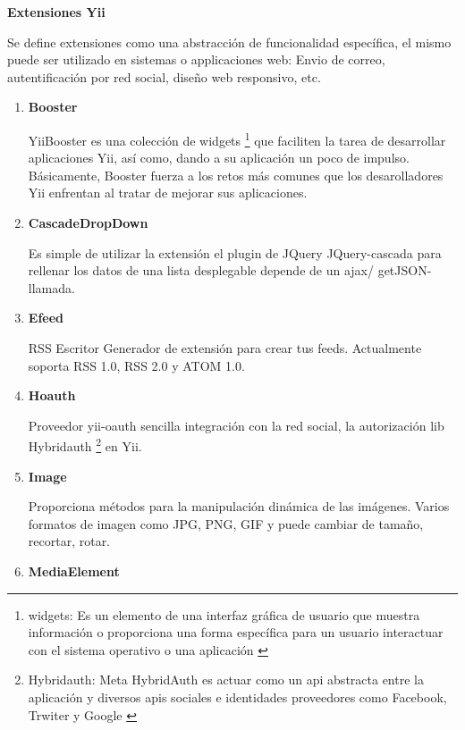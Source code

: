 \textbf{Extensiones Yii}

Se define extensiones como una abstracci\'{o}n de funcionalidad espec\'{i}fica, el
mismo puede ser utilizado en sistemas o applicaciones web: Envio de correo, 
autentificaci\'{o}n por red social, dise\~{n}o web responsivo, etc.

\begin{enumerate}

\item \textbf{Booster}

YiiBooster es una colecci\'{o}n de widgets \footnote{widgets: Es un elemento 
de una interfaz gr\'{a}fica de usuario que muestra informaci\'{o}n o 
proporciona una forma espec\'{i}fica para un usuario interactuar con el sistema
operativo o una aplicaci\'{o}n \cite{widget}} que faciliten la tarea de 
desarrollar aplicaciones Yii, as\'{i} como, dando a su aplicaci\'{o}n un poco 
de impulso. B\'{a}sicamente, Booster fuerza a los retos m\'{a}s comunes que los
desarolladores Yii enfrentan al tratar de mejorar sus aplicaciones. \cite{booster}

\item \textbf{CascadeDropDown}

Es simple de utilizar la extensi\'{o}n el plugin de JQuery JQuery-cascada para
rellenar los datos de una lista desplegable depende de un ajax/ getJSON-llamada.
 \cite{cascadedropdown}

\item \textbf{Efeed}

RSS Escritor Generador de extensi\'{o}n para crear tus feeds. Actualmente soporta
RSS 1.0, RSS 2.0 y ATOM 1.0. \cite{efeed}

\item \textbf{Hoauth}

Proveedor yii-oauth sencilla integraci\'{o}n con la red social, la autorizaci\'{o}n
lib Hybridauth \footnote{Hybridauth: Meta HybridAuth es actuar como un api 
abstracta entre la aplicaci\'{o}n y diversos apis sociales e identidades 
proveedores como Facebook, Trwiter y Google \cite{hybridauth}} en Yii. \cite{hoauth}

\item \textbf{Image}

Proporciona m\'{e}todos para la manipulaci\'{o}n din\'{a}mica de las im\'{a}genes.
Varios formatos de imagen como JPG, PNG, GIF y puede cambiar de tama\~{n}o, recortar,
rotar. \cite{image}

\item \textbf{MediaElement}


\end{enumerate}
